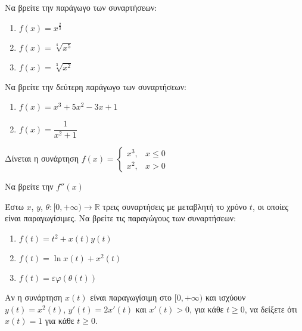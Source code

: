 \documentclass{presentation}
\begin{document}
\begin{askisi}
  Να βρείτε την παράγωγο των συναρτήσεων:
  \begin{enumerate}
    \item<1-> $f(x)=x^{\frac{2}{3}}$
    \item<2-> $f(x)=\sqrt[4]{x^5}$
    \item<3-> $f(x)=\sqrt[3]{x^2}$
  \end{enumerate}

\end{askisi}

\begin{askisi}
  Να βρείτε την δεύτερη παράγωγο των συναρτήσεων:
  \begin{enumerate}
    \item<1-> $f(x)=x^3+5x^2-3x+1$
    \item<2-> $f(x)=\dfrac{1}{x^2+1}$
  \end{enumerate}

\end{askisi}

\begin{askisi}
  Δίνεται η συνάρτηση
  $f(x)=\begin{cases}
      x^3, & x\le 0 \\
      x^2, & x>0
    \end{cases}$

  Να βρείτε την $f''(x)$

\end{askisi}

\begin{askisi}
  Έστω $x$, $y$, $θ:[0,+\infty)\to \mathbb{R}$ τρεις συναρτήσεις με μεταβλητή το χρόνο $t$, οι οποίες είναι παραγωγίσιμες. Να βρείτε τις παραγώγους των συναρτήσεων:
  \begin{enumerate}
    \item<1-> $f(t)=t^2+x(t)y(t)$
    \item<2-> $f(t)=\ln x(t) +x^2(t)$
    \item<3-> $f(t)=εφ(θ(t))$
  \end{enumerate}

\end{askisi}

\begin{askisi}
  Αν η συνάρτηση $x(t)$ είναι παραγωγίσιμη στο $[0,+\infty)$ και ισχύουν $y(t)=x^2(t)$, $y'(t)=2x'(t)$ και $x'(t)>0$, για κάθε $t\ge 0$, να δείξετε ότι $x(t)=1$ για κάθε $t\ge 0$.

\end{askisi}
\end{document}
